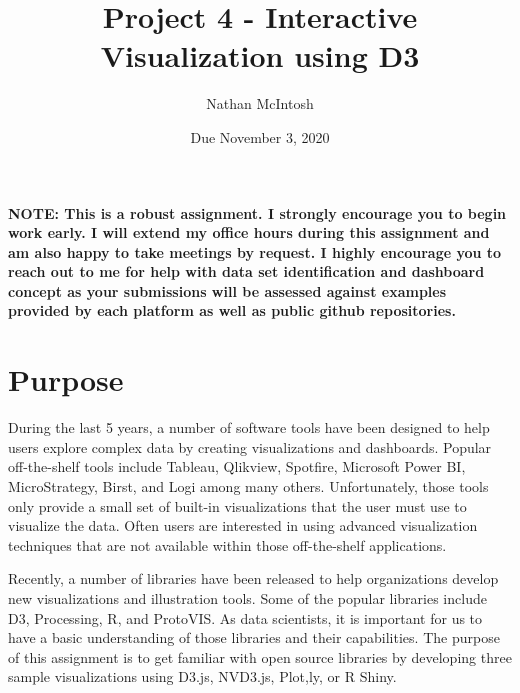 \documentclass{article}
\title{Project 4 - Interactive Visualization using D3}
\author{Nathan McIntosh}
\date{Due November 3, 2020}
\begin{document}
\maketitle

\textbf{NOTE: This is a robust assignment. I strongly encourage you to begin work early. I will extend my office hours during this assignment and am also happy to take meetings by request. I highly encourage you to reach out to me for help with data set identification and dashboard concept as your submissions will be assessed against examples provided by each platform as well as public github repositories.}

\section{Purpose}
During the last 5 years, a number of software tools have been designed to help users explore complex data by creating visualizations and dashboards. Popular off-the-shelf tools include Tableau, Qlikview, Spotfire, Microsoft Power BI, MicroStrategy, Birst, and Logi among many others. Unfortunately, those tools only provide a small set of built-in visualizations that the user must use to visualize the data.  Often users are interested in using advanced visualization techniques that are not available within those off-the-shelf applications.

Recently, a number of libraries have been released to help organizations develop new visualizations and illustration tools.  Some of the popular libraries include D3, Processing, R, and ProtoVIS.   As data scientists, it is important for us to have a basic understanding of those libraries and their capabilities.  The purpose of this assignment is to get familiar with open source libraries by developing three sample visualizations using D3.js, NVD3.js, Plot,ly, or R Shiny.
\end{document}
